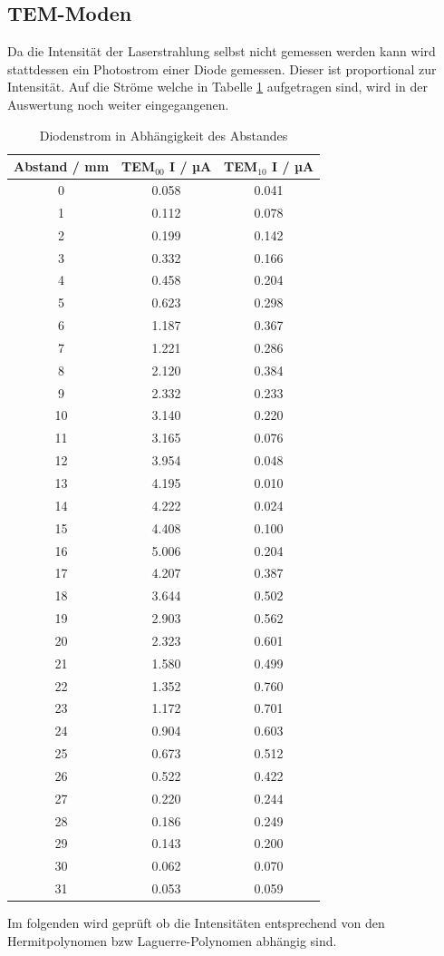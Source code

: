 \subsection{TEM-Moden}
Da die Intensität der Laserstrahlung selbst nicht gemessen werden kann wird stattdessen ein Photostrom einer Diode gemessen. Dieser ist proportional zur Intensität. Auf die Ströme welche in Tabelle \ref{tab:tem} aufgetragen sind, wird in der Auswertung noch weiter eingegangenen.
\begin{table}
  \centering
  \begin{tabular}{c|c c}
     \toprule
     Abstand / mm & TEM$_{00}$ I / µA & TEM$_{10}$ I / µA \\
     \midrule
     0		& 0.058		& 0.041	\\
     1		& 0.112		& 0.078	\\
     2		& 0.199		& 0.142	\\
     3		& 0.332		& 0.166	\\
     4		& 0.458		& 0.204	\\
     5		& 0.623		& 0.298	\\
     6		& 1.187		& 0.367	\\
     7		& 1.221		& 0.286	\\
     8		& 2.120		& 0.384	\\
     9		& 2.332		& 0.233	\\
     10		& 3.140		& 0.220	\\
     11		& 3.165		& 0.076	\\
     12		& 3.954		& 0.048	\\
     13		& 4.195		& 0.010	\\
     14		& 4.222		& 0.024	\\
     15		& 4.408		& 0.100	\\
     16		& 5.006		& 0.204	\\
     17		& 4.207		& 0.387	\\
     18		& 3.644		& 0.502	\\
     19		& 2.903		& 0.562	\\
     20		& 2.323		& 0.601	\\
     21		& 1.580		& 0.499	\\
     22		& 1.352		& 0.760	\\
     23		& 1.172		& 0.701	\\
     24		& 0.904		& 0.603	\\
     25		& 0.673		& 0.512	\\
     26		& 0.522		& 0.422	\\
     27		& 0.220		& 0.244	\\
     28		& 0.186		& 0.249	\\
     29		& 0.143		& 0.200	\\
     30		& 0.062		& 0.070	\\
     31		& 0.053		& 0.059	\\
     \bottomrule
  \end{tabular}
  \caption{Diodenstrom in Abhängigkeit des Abstandes}
  \label{tab:tem}
\end{table}
Im folgenden wird geprüft ob die Intensitäten entsprechend von den Hermitpolynomen bzw Laguerre-Polynomen abhängig sind.
